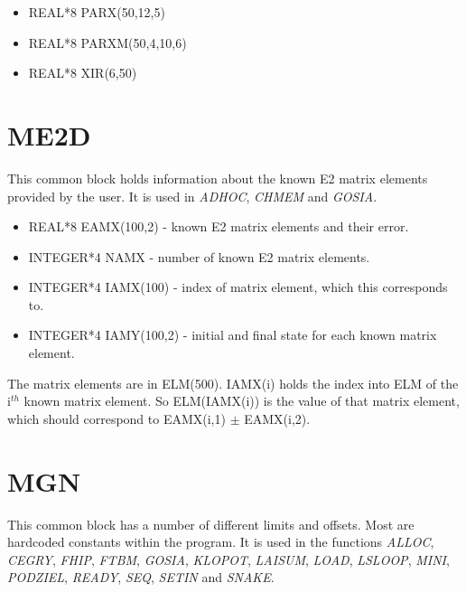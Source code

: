 \begin{itemize}
\item REAL*8 PARX(50,12,5)
\item REAL*8 PARXM(50,4,10,6)
\item REAL*8 XIR(6,50)
\end{itemize}

\section{ME2D}

This common block holds information about the known E2 matrix elements
provided by the user. It is used in {\em ADHOC}, {\em CHMEM} and {\em
GOSIA}.

\begin{itemize}
\item REAL*8 EAMX(100,2) - known E2 matrix elements and their error.
\item INTEGER*4 NAMX - number of known E2 matrix elements.
\item INTEGER*4 IAMX(100) - index of matrix element, which this corresponds
to.
\item INTEGER*4 IAMY(100,2) - initial and final state for each known matrix
element.
\end{itemize}

The matrix elements are in ELM(500). IAMX(i) holds the index into ELM of the
i$^{th}$ known matrix element. So ELM(IAMX(i)) is the value of that matrix
element, which should correspond to EAMX(i,1) $\pm$ EAMX(i,2).

\section{MGN}

This common block has a number of different limits and offsets. Most are
hardcoded constants within the program. It is used in the functions {\em
ALLOC}, {\em CEGRY}, {\em FHIP}, {\em FTBM}, {\em GOSIA}, {\em KLOPOT}, {\em
LAISUM}, {\em LOAD}, {\em LSLOOP}, {\em MINI}, {\em PODZIEL}, {\em READY},
{\em SEQ}, {\em SETIN} and {\em SNAKE}.


